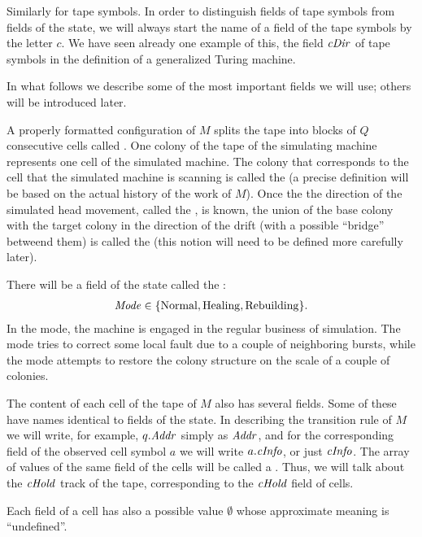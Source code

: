 \documentclass[12pt]{memoir}
\newcommand{\fld}[1]{\ensuremath{\textit{#1\/}}}
\newcommand{\Q}{Q}
\newcommand{\Addr}{\fld{Addr}}
\newcommand{\cDir}{\fld{cDir}}
\newcommand{\cHold}{\fld{cHold}}
\newcommand{\cInfo}{\fld{cInfo}}
\newcommand{\Mode}{\fld{Mode}}
\newcommand{\Normal}{\mathrm{Normal}}
\newcommand{\Rebuilding}{\mathrm{Rebuilding}}
\newcommand{\Healing}{\mathrm{Healing}}
\begin{document}
Similarly for tape symbols.
In order to distinguish fields of tape symbols from fields of the state,
we will always start the name of a field of the tape symbols by the letter \( c \).
We have seen already one example of this, the field \( \cDir \) of tape symbols
in the definition of a generalized Turing machine.

In what follows we describe some of the most important fields we will use;
others will be introduced later.

A properly formatted configuration of \( M \) splits the tape into blocks of \( \Q \)
consecutive cells called .
One colony of the tape of the simulating
machine represents one cell of the simulated machine.
The colony that corresponds to the cell that the
simulated machine is scanning is called the 
(a precise definition will be based on the actual history of the work of \( M \)).
Once the the direction of the simulated head movement, called the
, is known, the union of the base colony with the target colony in
the direction of the drift (with a possible ``bridge'' betweend them)
is called the  (this notion will need to be defined more carefully later).

There will be a field of the state called the :
 \begin{align*}
   \Mode\in\{ \Normal,\Healing, \Rebuilding \}.
 \end{align*}
In the  mode, the machine is engaged 
in the regular business of simulation.
The  mode tries to correct some local fault due to a couple of neighboring
bursts, while the  mode attempts to restore the colony structure
on the scale of a couple of colonies.

The content of each cell of the tape of \( M \) also has several fields.
Some of these have names identical to fields of the state.
In describing the transition rule of \( M \) we will write, for example,
\( q.\Addr \) simply as \( \Addr \), and for the corresponding field of the
observed cell symbol \( a \) we will write \( a.\cInfo \), or just \( \cInfo \).
The array of values of the same field of the cells will be called a .
Thus, we will talk about the \( \cHold \) track of the tape, corresponding to the
\( \cHold \) field of cells.

Each field of a cell has also a possible value
\( \emptyset \) whose approximate meaning is ``undefined''.
\end{document}

